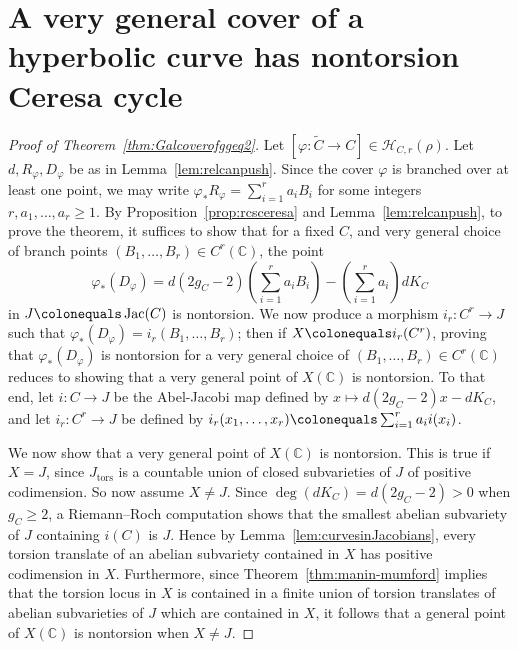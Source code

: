 \documentclass[reqno,10pt]{amsart}
\theoremstyle{definition}
\theoremstyle{definition}
\def\C{{\mathbb C}}
\def\C{{\mathbb C}}
\DeclareMathOperator{\Jac}{Jac}
\DeclareMathOperator{\tors}{tors}
\begin{document}
\section{A very general cover of a  hyperbolic curve has nontorsion Ceresa cycle}\label{sec:proofmainthm}



\begin{proof}[Proof of Theorem~\ref{thm:Galcoverofggeq2}]
Let $[\varphi \colon \widetilde{C} \rightarrow C] \in \mathcal{H}_{C,r}(\rho)$. Let $d, R_{\varphi},D_{\varphi}$ be as in Lemma~\ref{lem:relcanpush}.  %
Since the cover $\varphi$ is branched over at least one point, we may write $\varphi_*R_{\varphi} = \sum_{i=1}^r a_i B_i$ for some integers $r,a_1,\ldots,a_r \geq 1$. By Proposition~\ref{prop:rcsceresa} and Lemma~\ref{lem:relcanpush}, to prove the theorem, it suffices to show that for a fixed $C$, and very general choice of branch points $(B_1,\ldots,B_r) \in C^r(\C)$, the point 
\[ \varphi_*(D_{\varphi}) = d (2g_{C}-2) \left( \sum_{i=1}^r a_i B_i \right) - \left(\sum_{i=1}^r a_i \right)dK_C \] 
in $J \colonequals \Jac(C)$ is nontorsion. We now produce a morphism $i_r \colon C^r \rightarrow J$ such that $\varphi_*(D_{\varphi}) = i_r(B_1,\dots,B_r)$; then if $X \colonequals i_r(C^r)$, proving that $\varphi_*(D_{\varphi})$ is nontorsion for a very general choice of $(B_1,\dots,B_r) \in C^r(\C)$ reduces to showing that a very general point of $X(\C)$ is nontorsion. 
To that end, let $i \colon C \rightarrow J$ be the Abel-Jacobi map defined by $x \mapsto d(2g_{C}-2)x-dK_{C}$, and let  $i_r \colon C^r \rightarrow J$ be  defined by $i_r(x_1,\ldots,x_r) \colonequals \sum_{i=1}^r a_i i(x_i)$.  

We now show that a very general point of $X(\C)$ is nontorsion. This is true if $X=J$, since $J_{\tors}$ is a countable union of closed subvarieties of $J$ of positive codimension. So now assume $X \neq J$. Since $\deg(dK_C) = d(2g_C-2) > 0$ when $g_C \geq 2$, a Riemann--Roch computation shows that the smallest abelian subvariety of $J$ containing $i(C)$ is $J$. Hence by Lemma~\ref{lem:curvesinJacobians}, every torsion translate of an abelian subvariety contained in $X$ has positive codimension in $X$. Furthermore, since Theorem~\ref{thm:manin-mumford} implies that the torsion locus in $X$ is contained in a finite union of torsion translates of abelian subvarieties of $J$ which are contained in $X$, it follows that a general point of $X(\C)$ is nontorsion when $X \neq J$.
\end{proof}
\end{document}
